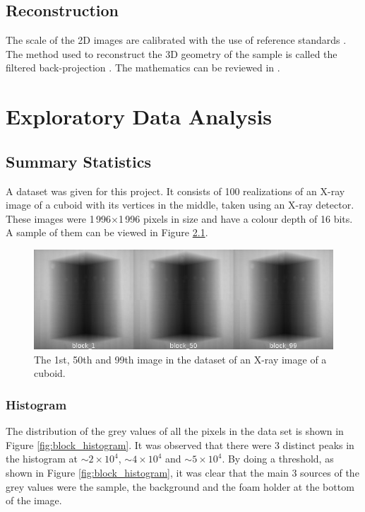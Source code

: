 \documentclass[12pt]{report}
\begin{document}
\section{Reconstruction}
The scale of the 2D images are calibrated with the use of reference standards \cite{bartscher2007enhancement}. The method used to reconstruct the 3D geometry of the sample is called the filtered back-projection \cite{michael2001x}. The mathematics can be reviewed in \cite{brooks1976principles}.

\chapter{Exploratory Data Analysis}
\section{Summary Statistics}
A dataset was given for this project. It consists of 100 realizations of an X-ray image of a cuboid with its vertices in the middle, taken using an X-ray detector. These images were 1\,996$\times$1\,996 pixels in size and have a colour depth of 16 bits. A sample of them can be viewed in Figure \ref{fig:block_montage}.

\begin{figure}
\centering
\includegraphics[width=1\textwidth]{figures/block_montage.jpg}
\caption{The 1st, 50th and 99th image in the dataset of an X-ray image of a cuboid.} 
\label{fig:block_montage}
\end{figure}

\subsection{Histogram}
The distribution of the grey values of all the pixels in the data set is shown in Figure \ref{fig:block_histogram}. It was observed that there were 3 distinct peaks in the histogram at $\sim2\times10^4$, $\sim4\times10^4$ and $\sim5\times10^4$. By doing a threshold, as shown in Figure \ref{fig:block_histogram}, it was clear that the main 3 sources of the grey values were the sample, the background and the foam holder at the bottom of the image.
\end{document}
